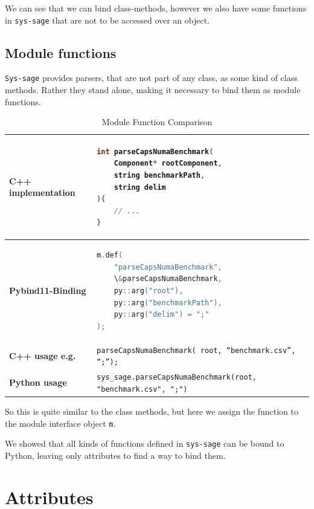 We can see that we can bind class-methods, however we also have some functions in \texttt{sys-sage} that are not to be accessed over an object.

\subsection{Module functions}

\texttt{Sys-sage} provides parsers, that are not part of any class, as some kind of class methods. Rather they stand alone, making it necessary to bind them as module functions.

\begin{table}[htbp]
\centering
\begin{tabular}{|l|l|}
\hline
\textbf{C++ implementation} &
\begin{lstlisting}[language=C++]
int parseCapsNumaBenchmark(
    Component* rootComponent,
    string benchmarkPath,
    string delim
){
    // ...
}
\end{lstlisting}
\\ \hline
\textbf{Pybind11-Binding} &
\begin{lstlisting}[language=C++]
m.def(
    "parseCapsNumaBenchmark",
    \&parseCapsNumaBenchmark,
    py::arg("root"),
    py::arg("benchmarkPath"),
    py::arg("delim") = ";"
);
\end{lstlisting}
\\ \hline
\textbf{C++ usage e.g.} &
\verb|parseCapsNumaBenchmark( root, “benchmark.csv”, “;”);| \\ \hline
\textbf{Python usage} &
\verb|sys_sage.parseCapsNumaBenchmark(root, "benchmark.csv", ";")| \\ \hline
\end{tabular}
\caption{Module Function Comparison}
\label{tab:module_functions}
\end{table}

So this is quite similar to the class methods, but here we assign the function to the module interface object \verb|m|.\cite[see Reference/Conveneince Classes for specific Python types]{pybind11-docu}
\newpage

We showed that all kinds of functions defined in \texttt{sys-sage} can be bound to Python, leaving only attributes to find a way to bind them.

\section{Attributes}

